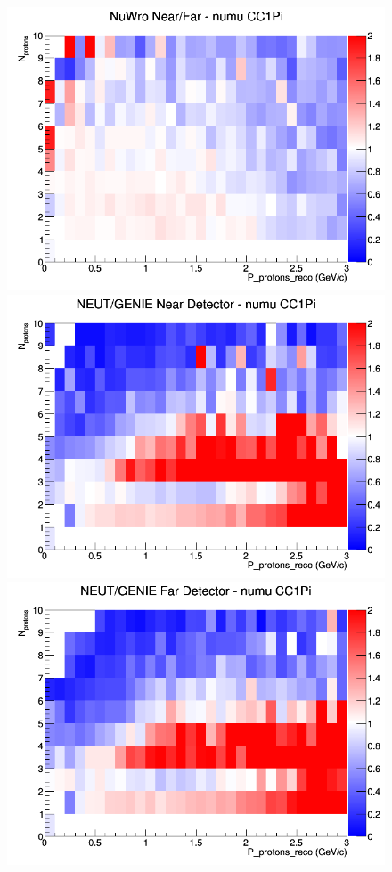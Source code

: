 \begin{figure}[h]
\endminipage
{}
\includegraphics[width=\linewidth]{eff_N_P/LAr/protons/ratios/CC1Pi_NuWro_numu_NF_N_P.png}
\endminipage
\newline
{}
\includegraphics[width=\linewidth]{eff_N_P/LAr/protons/ratios/CC1Pi_NEUT_GENIE_numu_near_N_P.png}
\endminipage
{}
\includegraphics[width=\linewidth]{eff_N_P/LAr/protons/ratios/CC1Pi_NEUT_GENIE_numu_far_N_P.png}

\end{figure}
